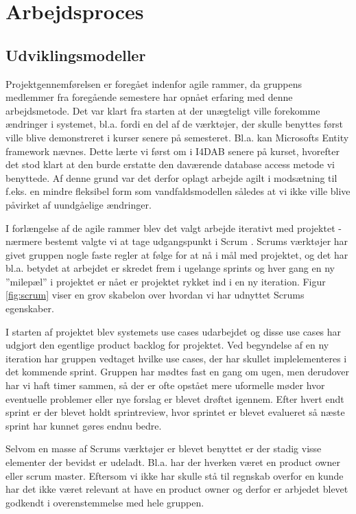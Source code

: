 \section{Arbejdsproces}

\subsection{Udviklingsmodeller}
Projektgennemførelsen er foregået indenfor agile rammer, da gruppens medlemmer fra foregående semestere har opnået erfaring med denne arbejdsmetode. Det var klart fra starten at der unægteligt ville forekomme ændringer i systemet, bl.a. fordi en del af de værktøjer, der skulle benyttes først ville blive demonstreret i kurser senere på semesteret. Bl.a. kan Microsofts Entity framework \citep{entityFrameworkWeb} nævnes. Dette lærte vi først om i I4DAB senere på kurset, hvorefter det stod klart at den burde erstatte den daværende database access metode vi benyttede. Af denne grund var det derfor oplagt arbejde agilt i modsætning til f.eks. en mindre fleksibel form som vandfaldsmodellen således at vi ikke ville blive påvirket af uundgåelige ændringer.

I forlængelse af de agile rammer blev det valgt arbejde iterativt med projektet - nærmere bestemt valgte vi at tage udgangspunkt i Scrum \citep{scrumWeb}. Scrums værktøjer har givet gruppen nogle faste regler at følge for at nå i mål med projektet, og det har bl.a. betydet at arbejdet er skredet frem i ugelange sprints og hver gang en ny ''milepæl'' i projektet er nået er projektet rykket ind i en ny iteration. Figur \ref{fig:scrum} viser en grov skabelon over hvordan vi har udnyttet Scrums egenskaber. 


I starten af projektet blev systemets use cases udarbejdet og disse use cases har udgjort den egentlige product backlog for projektet. Ved begyndelse af en ny iteration har gruppen vedtaget hvilke use cases, der har skullet implelementeres i det kommende sprint. Gruppen har mødtes fast en gang om ugen, men derudover har vi haft timer sammen, så der er ofte opstået mere uformelle møder hvor eventuelle problemer eller nye forslag er blevet drøftet igennem. Efter hvert endt sprint er der blevet holdt sprintreview, hvor sprintet er blevet evalueret så næste sprint har kunnet gøres endnu bedre.   

Selvom en masse af Scrums værktøjer er blevet benyttet er der stadig visse elementer der bevidst er udeladt. Bl.a. har der hverken været en product owner eller scrum master.  Eftersom vi ikke har skulle stå til regnskab overfor en kunde har det ikke været relevant at have en product owner og derfor er arbjedet blevet godkendt i overenstemmelse med hele gruppen.

